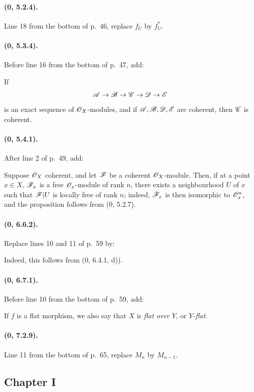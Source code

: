 \paragraph{(0, 5.2.4).}
Line 18 from the bottom of p.~46, replace $f_U$ by $f_U^*$.

\paragraph{(0, 5.3.4).}
Before line 16 from the bottom of p.~47, add:

If
\[
  \mathscr{A}\to\mathscr{B}\to\mathscr{C}\to\mathscr{D}\to\mathscr{E}
\]
is an exact sequence of $\mathscr{O}_X$-modules, and if
$\mathscr{A},\mathscr{B},\mathscr{D},\mathscr{E}$ are coherent, then $\mathscr{C}$ is
coherent.

\paragraph{(0, 5.4.1).}
After line 2 of p.~49, add:

Suppose $\mathscr{O}_X$ coherent, and let $\mathscr{F}$ be a coherent
$\mathscr{O}_X$-module. Then, if at a point $x\in X$, $\mathscr{F}_x$ is a free
$\mathscr{O}_x$-module of rank $n$, there exists a neighbourhood $U$ of $x$
such that $\mathscr{F}|U$ is locally free of rank $n$; indeed,
$\mathscr{F}_x$ is then isomorphic to $\mathscr{O}_x^n$, and the proposition follows
from (0, 5.2.7).

\paragraph{(0, 6.6.2).}
Replace lines 10 and 11 of p.~59 by:

Indeed, this follows from (0, 6.4.1, d)).

\paragraph{(0, 6.7.1).}
Before line 10 from the bottom of p.~59, add:

If $f$ is a flat morphism, we also say that $X$ is \emph{flat over
$Y$}, or \emph{$Y$-flat}.

\paragraph{(0, 7.2.9).}
Line 11 from the bottom of p.~65, replace $M_n$ by $M_{n-1}$.

\subsection*{Chapter I}

